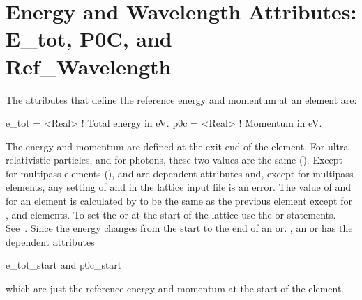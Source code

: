 \section[Energy and Wavelength Attributes]{Energy and Wavelength Attributes: E_tot, P0C, and \\ Ref_Wavelength}
\label{s:energy}
The attributes that define the reference energy and momentum at an element are:
\begin{example}
  e_tot  = <Real>  ! Total energy in eV.
  p0c    = <Real>  ! Momentum in eV.
\end{example}
The energy and momentum are defined at the exit end of the element.
For ultra--relativistic particles, and for photons, these two values
are the same (). Except for multipass elements
(),  and  are dependent attributes
and, except for multipass elements, any setting of  and
 in the lattice input file is an error. The value of
 and  for an element is calculated by \bmad to be
the same as the previous element except for ,  and
 elements. To set the  or  at the start of
the lattice use the  or  statements.
See~. Since the energy changes from the start to the end
of an  or. , an  or  has
the dependent attributes
\begin{example}
  e_tot_start   and
  p0c_start
\end{example}
which are just the reference energy and momentum at the start of the element.

